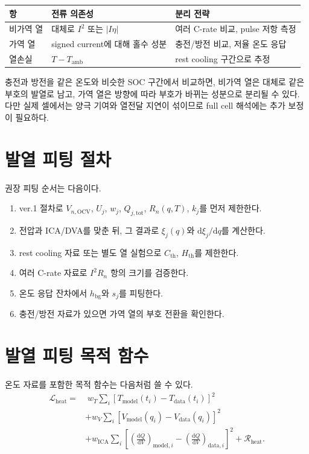 \documentclass[11pt,a4paper]{article}
\newcommand{\dd}{\mathrm{d}}
\newcommand{\OCV}{\mathrm{OCV}}
\newcommand{\tot}{\mathrm{tot}}
\newcommand{\bg}{\mathrm{bg}}
\begin{document}
\begin{longtable}{p{}p{}p{}}
\toprule
항 & 전류 의존성 & 분리 전략 \\
\midrule
\endhead
비가역 열 & 대체로 \(I^2\) 또는 \(|I\eta|\) & 여러 C-rate 비교, pulse 저항 측정 \\
가역 열 & signed current에 대해 홀수 성분 & 충전/방전 비교, 저율 온도 응답 \\
열손실 & \(T-T_{\mathrm{amb}}\) & rest cooling 구간으로 추정 \\
\bottomrule
\end{longtable}

충전과 방전을 같은 온도와 비슷한 SOC 구간에서 비교하면, 비가역 열은 대체로 같은 부호의 발열로 남고, 가역 열은 방향에 따라 부호가 바뀌는 성분으로 분리될 수 있다. 다만 실제 셀에서는 양극 기여와 열전달 지연이 섞이므로 full cell 해석에는 추가 보정이 필요하다.

\section{발열 피팅 절차}
권장 피팅 순서는 다음이다.

\begin{enumerate}[label=\arabic*)]
\item ver.1 절차로 \(V_{n,\OCV}\), \(U_j\), \(w_j\), \(Q_{j,\tot}\), \(R_n(q,T)\), \(k_j\)를 먼저 제한한다.
\item 전압과 ICA/DVA를 맞춘 뒤, 그 결과로 \(\xi_j(q)\)와 \(\dd\xi_j/\dd q\)를 계산한다.
\item rest cooling 자료 또는 별도 열 실험으로 \(C_{\mathrm{th}}\), \(H_{\mathrm{th}}\)를 제한한다.
\item 여러 C-rate 자료로 \(I^2R_n\) 항의 크기를 검증한다.
\item 온도 응답 잔차에서 \(h_{\bg}\)와 \(s_j\)를 피팅한다.
\item 충전/방전 자료가 있으면 가역 열의 부호 전환을 확인한다.
\end{enumerate}

\section{발열 피팅 목적 함수}
온도 자료를 포함한 목적 함수는 다음처럼 쓸 수 있다.
\begin{align}
\mathcal L_{\mathrm{heat}}
=&\;w_T\sum_i\left[T_{\mathrm{model}}(t_i)-T_{\mathrm{data}}(t_i)\right]^2 \\
&+w_V\sum_i\left[V_{\mathrm{model}}(q_i)-V_{\mathrm{data}}(q_i)\right]^2 \\
&+w_{\mathrm{ICA}}\sum_i\left[\left(\frac{\dd Q}{\dd V}\right)_{\mathrm{model},i}-\left(\frac{\dd Q}{\dd V}\right)_{\mathrm{data},i}\right]^2+\mathcal R_{\mathrm{heat}}.
\label{eq:v2_heat_loss_function}
\end{align}
\end{document}
